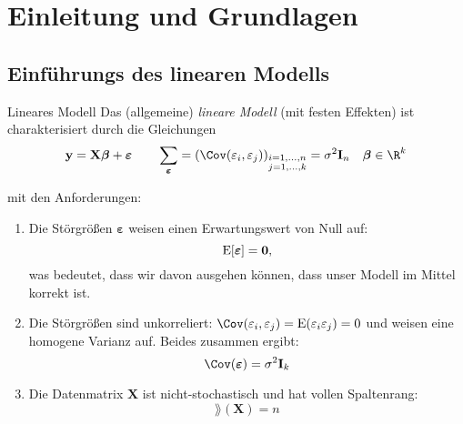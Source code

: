 \section{Einleitung und Grundlagen}

\subsection{Einführungs des linearen Modells}

\begin{defi}{Lineares Modell}
    Das (allgemeine) \emph{lineare Modell} (mit festen Effekten) ist charakterisiert durch die Gleichungen
    \[
        \mathbf{y} = \mathbf{X} {\boldsymbol{\beta}} + {\boldsymbol{\varepsilon}} \qquad \sum_{{\boldsymbol{\varepsilon}}} = (\Cov(\varepsilon_i, \varepsilon_j))_{\substack{i = 1, \ldots, n\\j = 1, \ldots, k}} = \sigma^2 \mathbf{I}_n \quad {\boldsymbol{\beta}} \in \R^k
    \]

    mit den Anforderungen:
    \begin{enumerate}
        \item Die Störgrößen ${\boldsymbol{\varepsilon}}$ weisen einen Erwartungswert von Null auf:
              \[
                  \operatorname{E} [{\boldsymbol{\varepsilon}}] = \mathbf{0},
              \]
              was bedeutet, dass wir davon ausgehen können, dass unser Modell im Mittel korrekt ist.
        \item Die Störgrößen sind unkorreliert: $\Cov(\varepsilon_i, \varepsilon_j) = \E(\varepsilon_i\varepsilon_j) = 0$ und weisen eine homogene Varianz auf.
              Beides zusammen ergibt:
              \[
                  \Cov({\boldsymbol{\varepsilon}}) = \sigma^2 \mathbf{I}_k
              \]
        \item Die Datenmatrix $\mathbf{X}$ ist nicht-stochastisch und hat vollen Spaltenrang:
              \[
                  \rang(\mathbf{X}) = n
              \]
    \end{enumerate}

    \tcbline


\end{defi}
